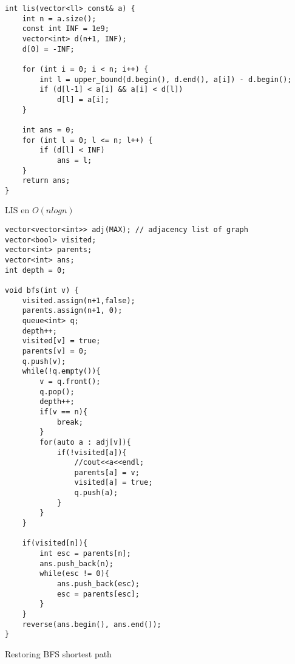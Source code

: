 \documentclass{article}
\begin{document}
\begin{lstlisting}
int lis(vector<ll> const& a) {
    int n = a.size();
    const int INF = 1e9;
    vector<int> d(n+1, INF);
    d[0] = -INF;

    for (int i = 0; i < n; i++) {
        int l = upper_bound(d.begin(), d.end(), a[i]) - d.begin();
        if (d[l-1] < a[i] && a[i] < d[l])
            d[l] = a[i];
    }

    int ans = 0;
    for (int l = 0; l <= n; l++) {
        if (d[l] < INF)
            ans = l;
    }
    return ans;
}
\end{lstlisting}

LIS en $O(nlogn)$

\begin{lstlisting}
vector<vector<int>> adj(MAX); // adjacency list of graph
vector<bool> visited;
vector<int> parents;
vector<int> ans;
int depth = 0;
 
void bfs(int v) {
    visited.assign(n+1,false);
    parents.assign(n+1, 0);
    queue<int> q;
    depth++;
    visited[v] = true;
    parents[v] = 0;
    q.push(v);
    while(!q.empty()){
        v = q.front();
        q.pop();
        depth++;
        if(v == n){
            break;
        }
        for(auto a : adj[v]){
            if(!visited[a]){
                //cout<<a<<endl;
                parents[a] = v;
                visited[a] = true;
                q.push(a);
            }
        }
    }

    if(visited[n]){
        int esc = parents[n];
        ans.push_back(n);
        while(esc != 0){
            ans.push_back(esc);
            esc = parents[esc];
        }
    }
    reverse(ans.begin(), ans.end());
}
\end{lstlisting}

Restoring BFS shortest path
\end{document}

